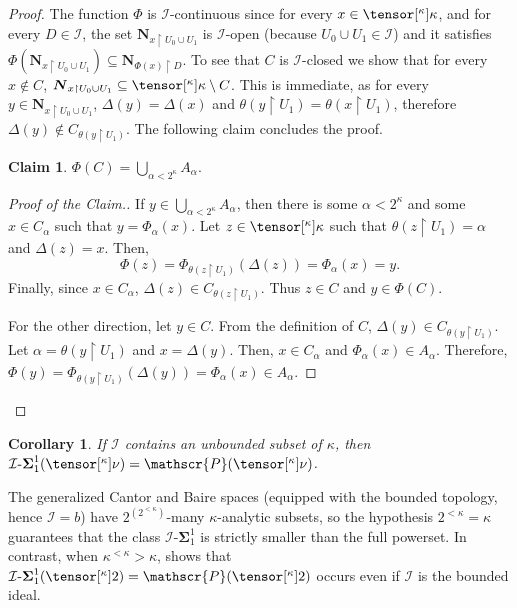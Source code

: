 \documentclass{amsart}
\numberwithin{equation}{section}
\newcommand{\I}{\mathcal{I}}
\newcommand{\pre}[2]{\tensor[^{#1}]{#2}{}}
\newcommand{\Nbhd}{\boldsymbol{N}}
\newcommand{\1}{\mathbf{I}}
\newcommand{\2}{\mathbf{II}}
\newcommand{\Sii}[2]{\k^+\text{-}\boldsymbol{\Sigma}^{ #1 }_{ #2}}
\newcommand{\Borid}{\I\text{-}\mathbf{Bor}}
\newcommand{\Siid}[2]{\I\text{-}\boldsymbol{\Sigma}^{ #1 }_{ #2}}
\renewcommand{\a}{\alpha}
\renewcommand{\k}{\kappa}
\newcommand{\pow}{\mathscr{P}}
\newcommand{\clopen}[1]{\Nbhd_{#1}}
\newtheorem{corollary}[theorem]{Corollary}
\theoremstyle{definition}
\newtheorem{claim}{Claim}[theorem]
\theoremstyle{remark}
\begin{document}
\begin{proof}
 The function \(\Phi\) is \(\I\)-continuous since for every \(x \in \pre{\k}{\k}\), and for every \(D \in \I\), the set \(\clopen{x \restriction U_0 \cup U_1}\) is \(\I\)-open (because \(U_0\cup U_1 \in \I\)) and it satisfies \(\Phi(\clopen{x \restriction U_0 \cup U_1})\subseteq \clopen{\Phi(x) \restriction D}\).
To see that \(C\) is \(\I\)-closed we show that for every \(x \notin C\), \(\clopen{x \restriction U_0 \cup U_1} \subseteq \pre{\k}{\k}\setminus C\). This is immediate, as for every \(y \in \clopen{x \restriction U_0 \cup U_1} \), \(\Delta(y)=\Delta(x)\) and \(\theta(y\restriction U_1)=\theta(x\restriction U_1)\), therefore \(\Delta(y) \notin C_{\theta(y\restriction U_1)}\). The following claim concludes the proof.
\begin{claim}
\(\Phi(C)=\bigcup_{\a<2^\k}A_\a\).
\end{claim}
\begin{proof}[Proof of the Claim.]
    If \(y \in \bigcup_{\a<2^\k}A_\a\), then there is some \(\a<2^\k\) and some \(x\in C_\a \) such that \(y=\Phi_\a(x)\). 
Let \(z \in \pre{\k}{\k}\) such that \(\theta(z \restriction U_1)=\a\) and \(\Delta(z)=x\).  
Then, 
\[
\Phi(z)=\Phi_{\theta(z\restriction U_1)}(\Delta(z))=%
\Phi_{\alpha}(x)=y.
\]
Finally, since $x\in C_\alpha$, $\Delta(z)\in C_{\theta(z\restriction U_1)}$. Thus $z\in C$ and \(y \in \Phi(C)\).

 For the other direction, let \(y \in C\). From the definition of $C$, $\Delta(y)\in C_{\theta(y\restriction U_1)}$. Let \(\a=\theta(y \restriction U_1)\) and \(x=\Delta(y)\). Then, \(x \in C_\a\) and $\Phi_\a(x)\in A_\a$. Therefore,  
\(\Phi(y)=\Phi_{\theta(y\restriction U_1)}(\Delta(y))=\Phi_\a(x)\in A_\a\).
\end{proof}\end{proof} 

\begin{corollary}\label{all_analitic}
    If \(\I\) contains an unbounded subset of \(\k\), then \(\Siid{1}{1}(\pre{\k}{\nu})=\pow(\pre{\k}{\nu})\).
\end{corollary}


The generalized Cantor and Baire spaces (equipped with the bounded topology, hence \(\I=b\)) have \(2^{(2^{<\k})}\)-many \(\k\)-analytic subsets, so the hypothesis \(2^{<\k}=\k\) guarantees that the class \(\Siid{1}{1}\) is strictly smaller than the full powerset. In contrast, when \(\k^{<\k}>\k\), \cite[Lemma 2.1]{HMV} shows that \(\Siid{1}{1}(\pre{\k}{2})=\pow(\pre{\k}{2})\) occurs even if $\I$ is the bounded ideal.
\end{document}

